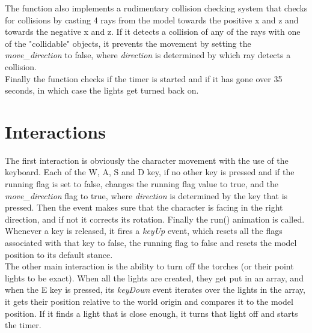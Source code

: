 \documentclass[14pt]{article}
\begin{document}
The function also implements a rudimentary collision checking system that checks for collisions by casting 4 rays from the model towards the positive x and z and towards the negative x and z. If it detects a collision of any of the rays with one of the "collidable" objects, it prevents the movement by setting the  \textit{move\_direction} to false, where  \textit{direction} is determined by which ray detects a collision.
\\

Finally the function checks if the timer is started and if it has gone over 35 seconds, in which case the lights get turned back on.
 
\bigskip


  
\section{Interactions}
The first interaction is obviously the character movement with the use of the keyboard. 
Each of the W, A, S and D key, if no other key is pressed and if the running flag is set to false, changes the running flag value to true, and the  \textit{move\_direction} flag to true, where  \textit{direction} is determined by the key that is pressed. Then the event makes sure that the character is facing in the right direction, and if not it corrects its rotation. Finally the run() animation is called.
\\

Whenever a key is released, it fires a  \textit{keyUp} event, which resets all the flags associated with that key to false, the running flag to false and resets the model position to its default stance.
\\

The other main interaction is the ability to turn off the torches (or their point lights to be exact). 
When all the lights are created, they get put in an array, and when the E key is pressed, its  \textit{keyDown} event iterates over the lights in the array, it gets their position relative to the world origin and compares it to the model position. If it finds a light that is close enough, it turns that light off and starts the timer. 
\end{document}
